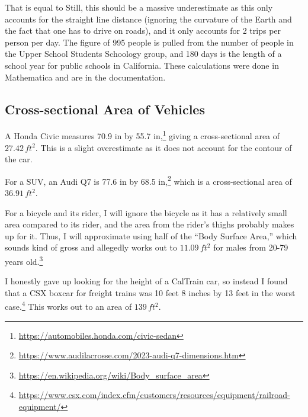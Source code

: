 \documentclass[12pt]{article}
\begin{document}
That is equal to  Still, this should be a massive underestimate as this only accounts for the straight line distance (ignoring the curvature of the Earth and the fact that one has to drive on roads), and it only accounts for 2 trips per person per day. The figure of 995 people is pulled from the number of people in the Upper School Students Schoology group, and 180 days is the length of a school year for public schools in California. These calculations were done in Mathematica and are in the documentation.

\newpage
\subsection{Cross-sectional Area of Vehicles}

A Honda Civic measures 70.9 in by 55.7 in,\footnote{\url{https://automobiles.honda.com/civic-sedan}} giving a cross-sectional area of $27.42\,\si{ft^2}$. This is a slight overestimate as it does not account for the contour of the car.

For a SUV, an Audi Q7 is 77.6 in by 68.5 in,\footnote{\url{https://www.audilacrosse.com/2023-audi-q7-dimensions.htm}} which is a cross-sectional area of $36.91\,\si{ft^2}$.

For a bicycle and its rider, I will ignore the bicycle as it has a relatively small area compared to its rider, and the area from the rider's thighs probably makes up for it. Thus, I will approximate using half of the ``Body Surface Area,'' which sounds kind of gross and allegedly works out to  $11.09\,\si{ft^2}$ for males from 20-79 years old.\footnote{\url{https://en.wikipedia.org/wiki/Body_surface_area}}

I honestly gave up looking for the height of a CalTrain car, so instead I found that a CSX boxcar for freight trains was 10 feet 8 inches by 13 feet in the worst case.\footnote{\url{https://www.csx.com/index.cfm/customers/resources/equipment/railroad-equipment/}} This works out to an area of $139\,\si{ft^2}$.
 
\end{document}

